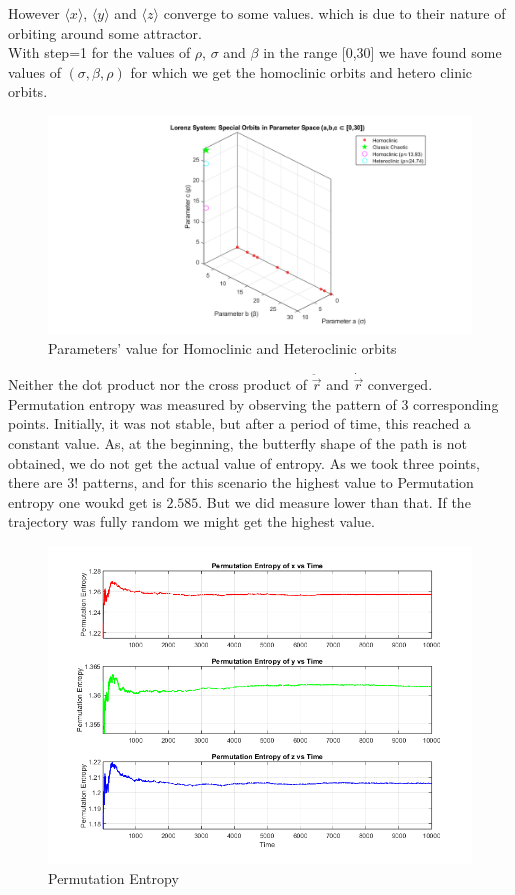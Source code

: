 \documentclass[%
reprint,
amsmath,amssymb,
aps,
floatfix,
]{revtex4-2}
\begin{document}
	\FloatBarrier
	However $\langle x\rangle$, $\langle y\rangle$ and  $\langle z\rangle$ converge to some values. which is due to their nature of orbiting around some attractor. \\
	With step=1 for the values of $\rho$, $\sigma$ and $\beta$ in the range [0,30] we have found some values of $(\sigma, \beta, \rho )$ for which we get the homoclinic orbits and hetero clinic orbits.
	\FloatBarrier
	\begin{figure}[htbp]
		\centering
		\includegraphics[width=1.5\linewidth]{homoclinic_heteroclinic_points.png}
		\caption{Parameters' value for Homoclinic and Heteroclinic orbits}
		\label{homoclini_heteroclinic}
	\end{figure}
	\FloatBarrier
	Neither the dot product nor the cross product of $\ddot{\vec{r}}$ and $\dot{\vec{r}}$ converged.\\
	Permutation entropy was measured by observing the pattern of 3 corresponding points. Initially, it was not stable, but after a period of time, this reached a constant value. As, at the beginning, the butterfly shape of the path is not obtained, we do not get the actual value of entropy. As we took three points, there are $3!$ patterns, and for this scenario the highest value to Permutation entropy one woukd get is $2.585$. But we did measure lower than that. If the trajectory was fully random we might get the highest value.
	\FloatBarrier
	\begin{figure}[htbp]
		\centering
		\includegraphics[width=0.8\linewidth]{PE_vs_time_x_y_z.png}
		\caption{Permutation Entropy}
		\label{PE_for_time_series}
	\end{figure}
	
\end{document}
